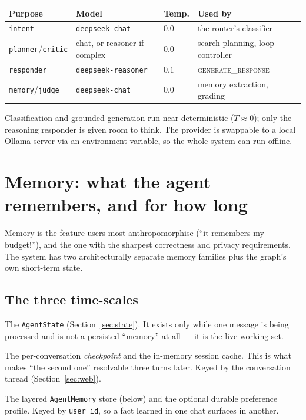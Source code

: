 \documentclass[11pt,a4paper]{article}
\newcommand{\code}[1]{\texttt{\small #1}}
\newcommand{\gnode}[1]{\textsc{#1}}  %
\begin{document}
\begin{longtable}{@{}p{} p{} p{} p{}@{}}
\toprule
\textbf{Purpose} & \textbf{Model} & \textbf{Temp.} & \textbf{Used by}\\
\midrule
\code{intent} & \code{deepseek-chat} & $0.0$ & the router's classifier\\
\code{planner}/\code{critic} & chat, or reasoner if complex & $0.0$ & search planning, loop controller\\
\code{responder} & \code{deepseek-reasoner} & $0.1$ & \gnode{generate\_response}\\
\code{memory}/\code{judge} & \code{deepseek-chat} & $0.0$ & memory extraction, grading\\
\bottomrule
\end{longtable}

\noindent Classification and grounded generation run near-deterministic ($T\!\approx\!0$);
only the reasoning responder is given room to think. The provider is swappable to a
local Ollama server via an environment variable, so the whole system can run offline.

\section{Memory: what the agent remembers, and for how long}
\label{sec:memory}

Memory is the feature users most anthropomorphise (``it remembers my budget!''), and
the one with the sharpest correctness and privacy requirements. The system has two
architecturally separate memory families plus the graph's own short-term state.

\subsection{The three time-scales}
\begin{description}[leftmargin=0pt,itemsep=3pt]
  \item[Short-term (within a turn).] The \code{AgentState}
        (Section~\ref{sec:state}). It exists only while one message is being processed
        and is not a persisted ``memory'' at all --- it is the live working set.
  \item[Medium-term (within a conversation).] The per-conversation
        \emph{checkpoint} and the in-memory session cache. This is what makes ``the
        second one'' resolvable three turns later. Keyed by the conversation thread
        (Section~\ref{sec:web}).
  \item[Long-term (across all of a user's conversations).] The layered
        \code{AgentMemory} store (below) and the optional durable preference profile.
        Keyed by \code{user\_id}, so a fact learned in one chat surfaces in another.
\end{description}
\end{document}

